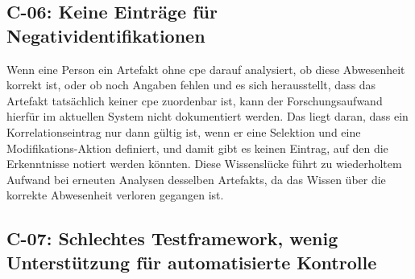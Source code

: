 \subsection{C-06: Keine Einträge für Negatividentifikationen}\label{subsec:c-06-falle-ohne-aktion-konnen-nicht-dokumentiert-werden}


Wenn eine Person ein Artefakt ohne \acrshort{cpe} darauf analysiert, ob diese Abwesenheit korrekt ist, oder ob noch Angaben fehlen und es sich herausstellt, dass das Artefakt tatsächlich keiner \acrshort{cpe} zuordenbar ist, kann der Forschungsaufwand hierfür im aktuellen System nicht dokumentiert werden.
Das liegt daran, dass ein Korrelationseintrag nur dann gültig ist, wenn er eine Selektion und eine Modifikations-Aktion definiert, und damit gibt es keinen Eintrag, auf den die Erkenntnisse notiert werden könnten.
Diese Wissenslücke führt zu wiederholtem Aufwand bei erneuten Analysen desselben Artefakts, da das Wissen über die korrekte Abwesenheit verloren gegangen ist.

\subsection{C-07: Schlechtes Testframework, wenig Unterstützung für automatisierte Kontrolle}\label{subsec:c-07-test-framework}


